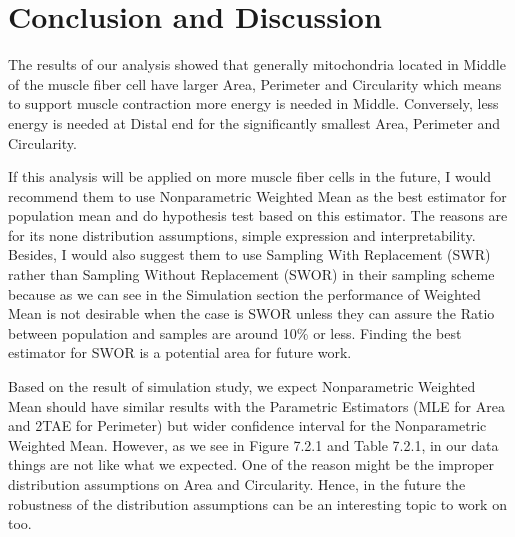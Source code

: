 \documentclass{article}\usepackage[]{graphicx}\usepackage[]{color}
\numberwithin{figure}{subsection} %
\numberwithin{table}{subsection} %
\begin{document}
\setcounter{section}{7}
\setcounter{page}{34}

\section{Conclusion and Discussion}
The results of our analysis showed that generally mitochondria located in Middle of the muscle fiber cell have larger Area, Perimeter and Circularity which means to support muscle contraction more energy is needed in Middle. Conversely, less energy is needed at Distal end for the significantly smallest Area, Perimeter and Circularity. 

If this analysis will be applied on more muscle fiber cells in the future, I would recommend them to use Nonparametric Weighted Mean as the best estimator for population mean and do hypothesis test based on this estimator. The reasons are for its none distribution assumptions, simple expression and interpretability. Besides, I would also suggest them to use Sampling With Replacement (SWR) rather than Sampling Without Replacement (SWOR) in their sampling scheme because as we can see in the Simulation section the performance of Weighted Mean is not desirable when the case is SWOR unless they can assure the Ratio between population and samples are around 10\% or less. Finding the best estimator for SWOR is a potential area for future work. 

Based on the result of simulation study, we expect Nonparametric Weighted Mean should have similar results with the Parametric Estimators (MLE for Area and 2TAE for Perimeter) but wider confidence interval for the Nonparametric Weighted Mean. However, as we see in Figure 7.2.1 and Table 7.2.1, in our data things are not like what we expected. One of the reason might be the improper distribution assumptions on Area and Circularity. Hence, in the future the robustness of the distribution assumptions can be an interesting topic to work on too.
\end{document}
